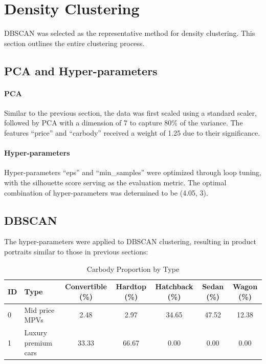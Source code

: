 \documentclass{article}
\begin{document}
\section{Density Clustering}
DBSCAN \cite{Ester1996} was selected as the representative method for density clustering.
This section outlines the entire clustering process.

\subsection{PCA and Hyper-parameters}
\paragraph{PCA} Similar to the previous section, the data was first scaled using a standard scaler, followed by PCA with a dimension of 7 to capture 80\% of the variance.
The features ``price'' and ``carbody'' received a weight of 1.25 due to their significance.

\paragraph{Hyper-parameters}
Hyper-parameters ``eps'' and ``min\_samples'' were optimized through loop tuning, with the silhouette score serving as the evaluation metric.
The optimal combination of hyper-parameters was determined to be (4.05, 3).

\subsection{DBSCAN}
The hyper-parameters were applied to DBSCAN clustering, resulting in product portraits similar to those in previous sections:
\begin{table}[H]
    \centering
    \small
    \caption{Carbody Proportion by Type}
    \begin{tabular}{llccccc}
        \toprule
        \textbf{ID} & \textbf{Type}       & \textbf{Convertible (\%)} & \textbf{Hardtop (\%)} & \textbf{Hatchback (\%)} & \textbf{Sedan (\%)} & \textbf{Wagon (\%)} \\
        \midrule
        0           & Mid price MPVs      & 2.48                      & 2.97                  & 34.65                   & 47.52               & 12.38               \\
        1           & Luxury premium cars & 33.33                     & 66.67                 & 0.00                    & 0.00                & 0.00                \\
        \bottomrule
    \end{tabular}
\end{table}
\end{document}
